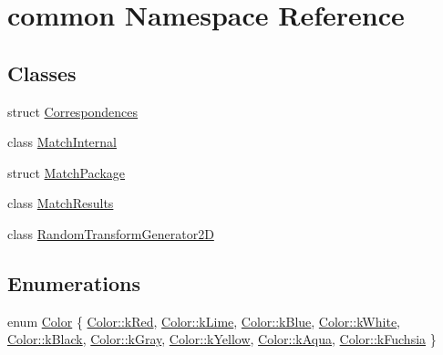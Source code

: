 \hypertarget{namespacecommon}{}\section{common Namespace Reference}
\label{namespacecommon}
\subsection*{Classes}
\begin{DoxyCompactItemize}
\item 
struct \hyperlink{structcommon_1_1Correspondences}{Correspondences}
\item 
class \hyperlink{classcommon_1_1MatchInternal}{Match\+Internal}
\item 
struct \hyperlink{structcommon_1_1MatchPackage}{Match\+Package}
\item 
class \hyperlink{classcommon_1_1MatchResults}{Match\+Results}
\item 
class \hyperlink{classcommon_1_1RandomTransformGenerator2D}{Random\+Transform\+Generator2D}
\end{DoxyCompactItemize}
\subsection*{Enumerations}
\begin{DoxyCompactItemize}
\item 
enum \hyperlink{namespacecommon_a325f61d2a1dcd20782fbb1421c0c3631}{Color} \{ \newline
\hyperlink{namespacecommon_a325f61d2a1dcd20782fbb1421c0c3631afb0136b923af8c04b31a9d1b5e989acf}{Color\+::k\+Red}, 
\hyperlink{namespacecommon_a325f61d2a1dcd20782fbb1421c0c3631ab7b3861337a76c8ac3cfc5ec8ec49a24}{Color\+::k\+Lime}, 
\hyperlink{namespacecommon_a325f61d2a1dcd20782fbb1421c0c3631a8d069917ec494cc042c27acaad671f52}{Color\+::k\+Blue}, 
\hyperlink{namespacecommon_a325f61d2a1dcd20782fbb1421c0c3631ad368dbde55a733c6dde5a20566d50736}{Color\+::k\+White}, 
\newline
\hyperlink{namespacecommon_a325f61d2a1dcd20782fbb1421c0c3631ac5157738e8808c557e6cac46c034a2db}{Color\+::k\+Black}, 
\hyperlink{namespacecommon_a325f61d2a1dcd20782fbb1421c0c3631a5d82e39ac78ae57980c4156efef59c16}{Color\+::k\+Gray}, 
\hyperlink{namespacecommon_a325f61d2a1dcd20782fbb1421c0c3631a4c6c30a3642462190739bb7f13af9c7b}{Color\+::k\+Yellow}, 
\hyperlink{namespacecommon_a325f61d2a1dcd20782fbb1421c0c3631a82c602e70d64cffd84b9662ebeb4435d}{Color\+::k\+Aqua}, 
\newline
\hyperlink{namespacecommon_a325f61d2a1dcd20782fbb1421c0c3631abead6bc4d4eca2252128b312324b19e2}{Color\+::k\+Fuchsia}
 \}
\end{DoxyCompactItemize}
